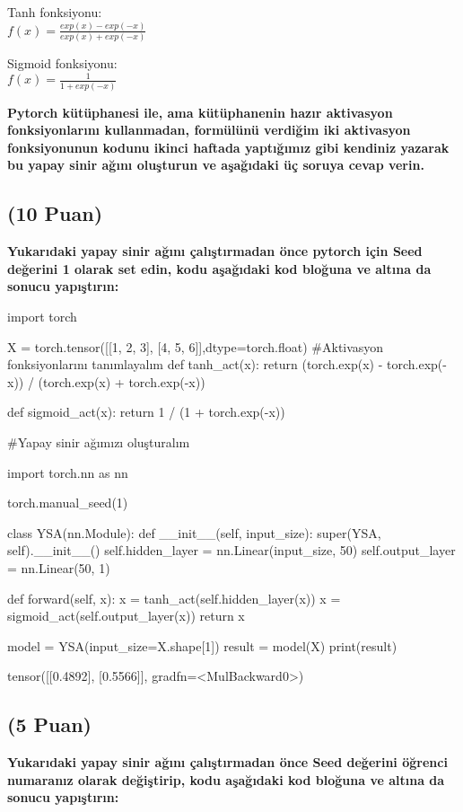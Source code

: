 \documentclass[11pt]{article}
\begin{document}
Tanh fonksiyonu:\\
$f(x) = \frac{exp(x) - exp(-x)}{exp(x) + exp(-x)}$
\vspace{.2in}

Sigmoid fonksiyonu:\\
$f(x) = \frac{1}{1 + exp(-x)}$

\vspace{.2in}
 \textbf{Pytorch kütüphanesi ile, ama kütüphanenin hazır aktivasyon fonksiyonlarını kullanmadan, formülünü verdiğim iki aktivasyon fonksiyonunun kodunu ikinci haftada yaptığımız gibi kendiniz yazarak bu yapay sinir ağını oluşturun ve aşağıdaki üç soruya cevap verin.}
 
\subsection{(10 Puan)} \textbf{Yukarıdaki yapay sinir ağını çalıştırmadan önce pytorch için Seed değerini 1 olarak set edin, kodu aşağıdaki kod bloğuna ve altına da sonucu yapıştırın:}

\begin{python}
import torch

X = torch.tensor([[1, 2, 3], [4, 5, 6]],dtype=torch.float)
#Aktivasyon fonksiyonlarını tanımlayalım
def tanh_act(x):
    return (torch.exp(x) - torch.exp(-x)) / (torch.exp(x) + torch.exp(-x))

def sigmoid_act(x):
    return 1 / (1 + torch.exp(-x))
    
#Yapay sinir ağımızı oluşturalım

import torch.nn as nn

torch.manual_seed(1)

class YSA(nn.Module):
    def __init__(self, input_size):
        super(YSA, self).__init__()
        self.hidden_layer = nn.Linear(input_size, 50)
        self.output_layer = nn.Linear(50, 1)

    def forward(self, x):
        x = tanh_act(self.hidden_layer(x))
        x =  sigmoid_act(self.output_layer(x))
        return x
        
model = YSA(input_size=X.shape[1])
result = model(X)
print(result)
\end{python}

tensor([[0.4892],
        [0.5566]], gradfn=<MulBackward0>)

\subsection{(5 Puan)} \textbf{Yukarıdaki yapay sinir ağını çalıştırmadan önce Seed değerini öğrenci numaranız olarak değiştirip, kodu aşağıdaki kod bloğuna ve altına da sonucu yapıştırın:}
\end{document}
